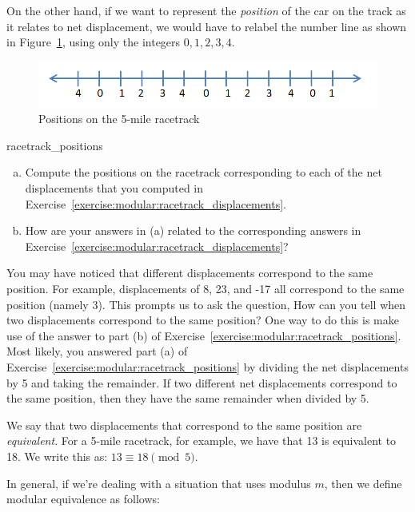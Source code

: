 On the other hand, if we want to represent the \emph{position} of the car on the track as it relates to net displacement, we would have to relabel the number line as shown in  Figure~\ref{fig:positions}, using only the integers $0,1,2,3,4$.   
\begin{figure}[h]
\begin{center}
\includegraphics[width=4.5in]{images/integers_mod_5.png}
\end{center}
\caption{\label{fig:positions}Positions on the 5-mile racetrack}
\end{figure}

\begin{exercise}{racetrack_positions}
\begin{enumerate}[(a)]
\item
Compute the positions on the racetrack corresponding to each of the net displacements that you computed in Exercise~\ref{exercise:modular:racetrack_displacements}.
\item
How are your answers in (a) related to the corresponding answers in Exercise~\ref{exercise:modular:racetrack_displacements}?
\end{enumerate}
\end{exercise}

You may have noticed that different displacements correspond to the same position. For example, displacements of 8, 23, and -17 all correspond to the same position (namely 3). This prompts us to ask the question,  How can you tell when two displacements correspond to the same position?
One way to do this is make use of the answer to part (b) of Exercise~\ref{exercise:modular:racetrack_positions}. Most likely, you answered part (a) of Exercise~\ref{exercise:modular:racetrack_positions} by dividing the net displacements by 5 and taking the remainder. If two different net displacements correspond to the same position, then they have the same remainder when divided by 5.

We say that two displacements that correspond to the same position are \emph{equivalent}. For a 5-mile racetrack, for example, we have that 13 is equivalent to 18. We write this as: $13 \equiv 18 \pmod{5}$.

In general, if we're dealing with a situation that uses modulus $m$, then we define modular equivalence
as follows:

